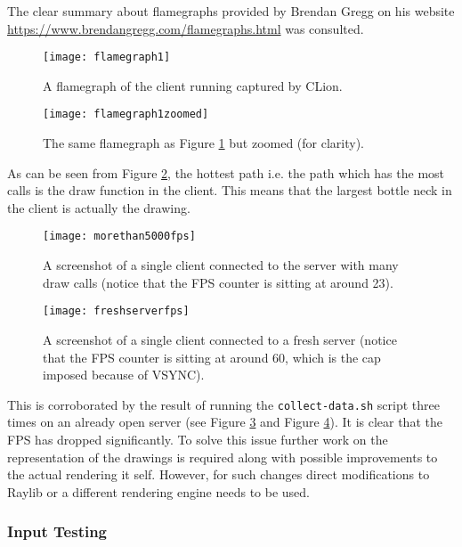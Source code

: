 \documentclass[article]{uom-coursework}
\begin{document}
\begin{attrib}
    The clear summary about flamegraphs provided by Brendan
    Gregg on his website
    \url{https://www.brendangregg.com/flamegraphs.html} was
    consulted.
\end{attrib}

\begin{figure}[H]
\centering
\texttt{[image: flamegraph1]}
\caption{A flamegraph of the client running captured by CLion.}
\label{fig:flamegraph}
\end{figure}

\begin{figure}[H]
\centering
\texttt{[image: flamegraph1zoomed]}
\caption{The same flamegraph as Figure \ref{fig:flamegraph} but zoomed (for clarity).}
\label{fig:flamegraphzoomed}
\end{figure}

As can be seen from Figure \ref{fig:flamegraphzoomed}, the
hottest path i.e. the path which has the most calls is the draw
function in the client. This means that the largest bottle neck
in the client is actually the drawing.

\begin{figure}[H]
\centering
\texttt{[image: morethan5000fps]}
\caption{A screenshot of a single client connected to the server
with many draw calls (notice that the FPS counter is sitting at
around 23).}
\label{fig:stressedclient}
\end{figure}

\begin{figure}[H]
\centering
\texttt{[image: freshserverfps]}
\caption{A screenshot of a single client connected to a fresh
server (notice that the FPS counter is sitting at around 60,
which is the cap imposed because of VSYNC).}
\label{fig:freshclient}
\end{figure}

This is corroborated by the result of running the
\texttt{collect-data.sh} script three times on an already open
server (see Figure \ref{fig:stressedclient} and Figure
\ref{fig:freshclient}). It is clear that the FPS has dropped
significantly. To solve this issue further work on the
representation of the drawings is required along with possible
improvements to the actual rendering it self. However, for such
changes direct modifications to Raylib or a different rendering
engine needs to be used.

\subsubsection{Input Testing}
\end{document}
